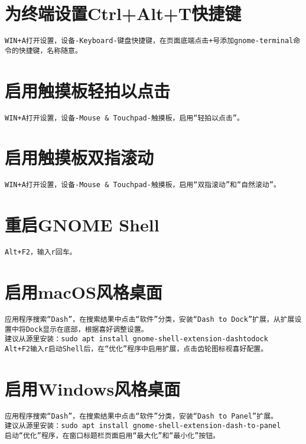 \documentclass[a4paper,fontset=fandol,zihao=-4,linespread=1.2]{ctexbook}
\begin{document}
\section{为终端设置Ctrl+Alt+T快捷键}
\begin{lstlisting}
WIN+A打开设置，设备-Keyboard-键盘快捷键，在页面底端点击+号添加gnome-terminal命令的快捷键，名称随意。
\end{lstlisting}

\section{启用触摸板轻拍以点击}
\begin{lstlisting}
WIN+A打开设置，设备-Mouse & Touchpad-触摸板，启用“轻拍以点击”。
\end{lstlisting}

\section{启用触摸板双指滚动}
\begin{lstlisting}
WIN+A打开设置，设备-Mouse & Touchpad-触摸板，启用“双指滚动”和“自然滚动”。
\end{lstlisting}

\section{重启GNOME Shell}
\begin{lstlisting}
Alt+F2，输入r回车。
\end{lstlisting}

\section{启用macOS风格桌面}
\begin{lstlisting}
应用程序搜索“Dash”，在搜索结果中点击“软件”分类，安装“Dash to Dock”扩展，从扩展设置中将Dock显示在底部，根据喜好调整设置。
建议从源里安装：sudo apt install gnome-shell-extension-dashtodock
Alt+F2输入r启动Shell后，在“优化”程序中启用扩展，点击齿轮图标视喜好配置。
\end{lstlisting}

\section{启用Windows风格桌面}
\begin{lstlisting}
应用程序搜索“Dash”，在搜索结果中点击“软件”分类，安装“Dash to Panel”扩展。
建议从源里安装：sudo apt install gnome-shell-extension-dash-to-panel
启动“优化”程序，在窗口标题栏页面启用“最大化”和“最小化”按钮。
\end{lstlisting}
\end{document}
